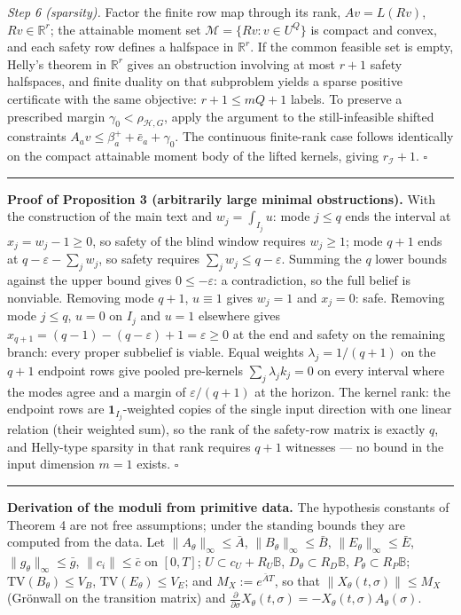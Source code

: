 \documentclass[10pt,article]{article}
\newcommand{\rulebar}{\begin{center}\rule{0.5\linewidth}{0.5pt}\end{center}}
\begin{document}
\emph{Step 6 (sparsity).} Factor the finite row map through its rank,
\(A v = L(Rv)\), \(Rv \in \mathbb R^{r}\); the attainable moment set
\(\mathcal M = \{Rv : v \in U^{Q}\}\) is compact and convex, and each safety
row defines a halfspace in \(\mathbb R^{r}\). If the common feasible set is
empty, Helly's theorem in \(\mathbb R^{r}\) gives an obstruction involving at
most \(r + 1\) safety halfspaces, and finite duality on that subproblem
yields a sparse positive certificate with the same objective: \(r + 1 \le mQ
+ 1\) labels. To preserve a prescribed margin \(\gamma_0 < \rho_{\mathcal
H,G}\), apply the argument to the still-infeasible shifted constraints \(A_a
v \le \beta_a^{+} + \bar e_a + \gamma_0\). The continuous finite-rank case
follows identically on the compact attainable moment body of the lifted
kernels, giving \(r_{\mathcal I} + 1\). \hfill\(\square\)
\rulebar

\textbf{Proof of Proposition 3 (arbitrarily large minimal obstructions).}
With the construction of the main text and \(w_j = \int_{I_j} u\): mode
\(j \le q\) ends the interval at \(x_j = w_j - 1 \ge 0\), so safety of the
blind window requires \(w_j \ge 1\); mode \(q+1\) ends at \(q - \varepsilon -
\sum_j w_j\), so safety requires \(\sum_j w_j \le q - \varepsilon\). Summing
the \(q\) lower bounds against the upper bound gives \(0 \le -\varepsilon\):
a contradiction, so the full belief is nonviable. Removing mode \(q+1\),
\(u \equiv 1\) gives \(w_j = 1\) and \(x_j = 0\): safe. Removing mode \(j \le
q\), \(u = 0\) on \(I_j\) and \(u = 1\) elsewhere gives \(x_{q+1} =
(q-1) - (q - \varepsilon) + 1 = \varepsilon \ge 0\) at the end and safety on
the remaining branch: every proper subbelief is viable. Equal weights
\(\lambda_j = 1/(q{+}1)\) on the \(q+1\) endpoint rows give pooled pre-kernels
\(\sum_j \lambda_j k_j = 0\) on every interval where the modes agree and a
margin of \(\varepsilon/(q{+}1)\) at the horizon. The kernel rank: the
endpoint rows are \(\mathbf 1_{I_j}\)-weighted copies of the single input
direction with one linear relation (their weighted sum), so the rank of the
safety-row matrix is exactly \(q\), and Helly-type sparsity in that rank
requires \(q + 1\) witnesses --- no bound in the input dimension \(m = 1\)
exists. \hfill\(\square\)
\rulebar

\textbf{Derivation of the moduli from primitive data.} The hypothesis
constants of Theorem 4 are not free assumptions; under the standing bounds
they are computed from the data. Let
\(\|A_\theta\|_\infty \le \bar A\), \(\|B_\theta\|_\infty \le
\bar B\), \(\|E_\theta\|_\infty \le \bar E\),
\(\|g_\theta\|_\infty \le \bar g\), \(\|c_i\| \le \bar c\) on
\([0,T]\); \(U \subset c_U + R_U\mathbb B\),
\(D_\theta \subset R_D\mathbb B\), \(P_\theta \subset R_P\mathbb B\);
\(\mathrm{TV}(B_\theta) \le V_B\), \(\mathrm{TV}(E_\theta) \le
V_E\); and \(M_X := e^{\bar A T}\), so that
\(\|X_\theta(t, \sigma)\| \le M_X\) (Gr\"onwall on the transition
matrix) and \(\tfrac{\partial}{\partial \sigma}
X_\theta(t, \sigma) = -X_\theta(t, \sigma) A_\theta(\sigma)\).
\end{document}
